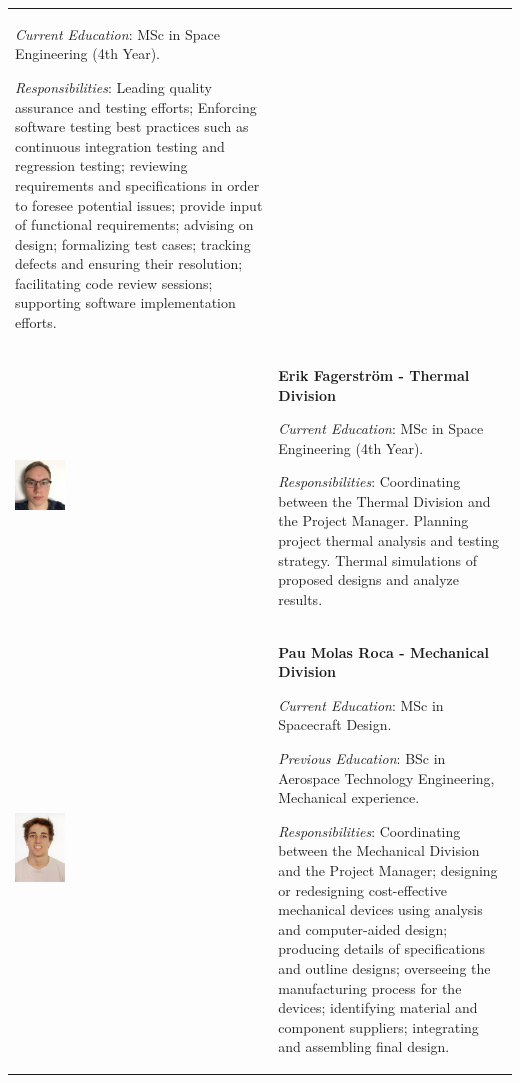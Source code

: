 \begin{longtable}[]{m{} m{}}
\smallskip
\textit{Current Education}: MSc in Space Engineering (4th Year).

\smallskip
\textit{Responsibilities}: Leading quality assurance and testing efforts; Enforcing software testing best practices such as continuous integration testing and regression testing; reviewing requirements and specifications in order to foresee potential issues; provide input of functional requirements; advising on design; formalizing test cases; tracking defects and ensuring their resolution; facilitating code review sessions; supporting software implementation efforts.     
\bigskip
\\


\includegraphics[width=0.2\textwidth]{1-introduction/img/erik-fagerstrom.jpg} & \textbf{Erik Fagerström - Thermal Division}

\smallskip
\textit{Current Education}: MSc in Space Engineering (4th Year).


\smallskip
\textit{Responsibilities}: Coordinating between the Thermal Division and the Project Manager. Planning project thermal analysis and testing strategy. Thermal simulations of proposed designs and analyze results.
\bigskip
\\


\includegraphics[width=0.2\textwidth]{1-introduction/img/pau-molas-roca.jpg} & \textbf{Pau Molas Roca - Mechanical Division}

\smallskip
\textit{Current Education}: MSc in Spacecraft Design.

\smallskip
\textit{Previous Education}: BSc in Aerospace Technology Engineering, Mechanical experience.

\smallskip
\textit{Responsibilities}: Coordinating between the Mechanical Division and the Project Manager; designing or redesigning cost-effective mechanical devices using analysis and computer-aided design; producing details of specifications and outline designs; overseeing the manufacturing process for the devices; identifying material and component suppliers; integrating and assembling final design.   \bigskip
\\



\end{longtable}
